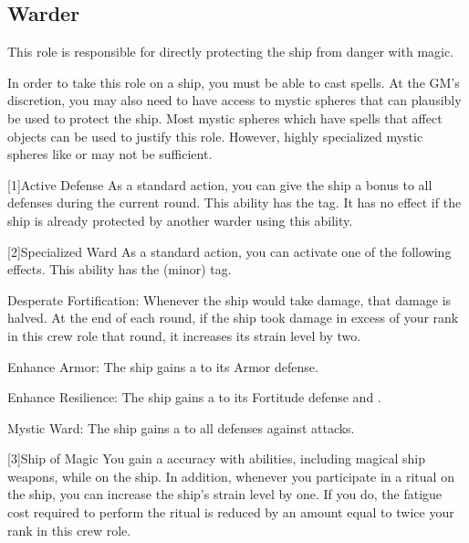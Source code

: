   \subsection{Warder}
    This role is responsible for directly protecting the ship from danger with magic.

    In order to take this role on a ship, you must be able to cast spells.
    At the GM's discretion, you may also need to have access to mystic spheres that can plausibly be used to protect the ship.
    Most mystic spheres which have spells that affect objects can be used to justify this role.
    However, highly specialized mystic spheres like  or  may not be sufficient.

    [1]{Active Defense} As a standard action, you can give the ship a  bonus to all defenses during the current round.
      This ability has the  tag.
      It has no effect if the ship is already protected by another warder using this ability.

    [2]{Specialized Ward} As a standard action, you can activate one of the following effects.
      This ability has the  (minor) tag.
      \begin{raggeditemize}
        \item Desperate Fortification: Whenever the ship would take damage, that damage is halved.
          At the end of each round, if the ship took damage in excess of your rank in this crew role that round, it increases its strain level by two.
        \item Enhance Armor: The ship gains a   to its Armor defense.
        \item Enhance Resilience: The ship gains a   to its Fortitude defense and .
        \item Mystic Ward: The ship gains a   to all defenses against \magical attacks.
      \end{raggeditemize}

    [3]{Ship of Magic} You gain a  accuracy with \magical abilities, including magical ship weapons, while on the ship.
      In addition, whenever you participate in a ritual on the ship, you can increase the ship's strain level by one.
      If you do, the fatigue cost required to perform the ritual is reduced by an amount equal to twice your rank in this crew role.

